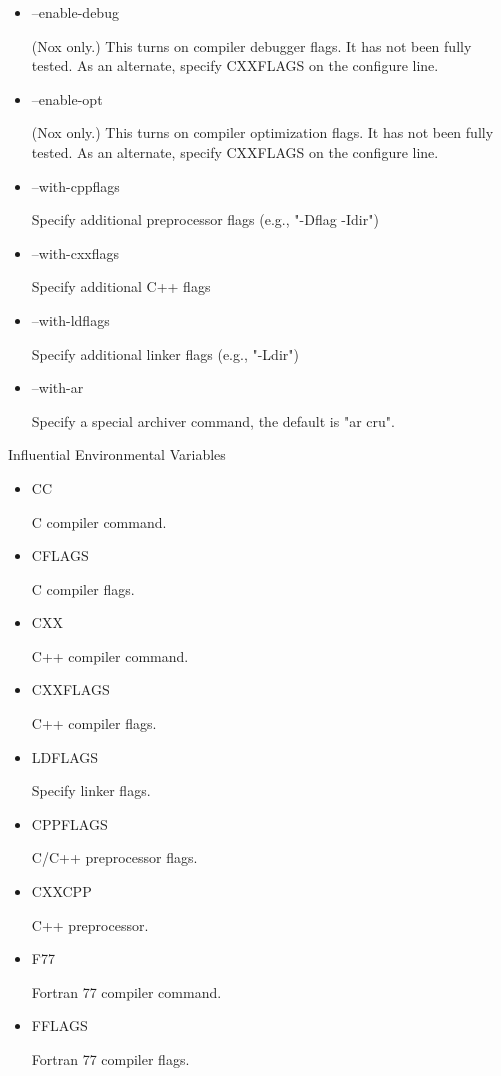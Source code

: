 \documentclass[12pt,relax]{SANDreport}
\begin{document}
\begin{itemize}
\item --enable-debug 

(Nox only.)  This turns on compiler debugger flags. It has 
not been fully tested. As an alternate, specify CXXFLAGS on the 
                 configure line.

\item --enable-opt

(Nox only.)  This turns on compiler optimization flags. It 
has not been fully tested. As an alternate, specify CXXFLAGS on the 
                 configure line. 

\item --with-cppflags 

Specify additional preprocessor flags (e.g., "-Dflag -Idir") 

\item --with-cxxflags 

Specify additional C++ flags 

\item --with-ldflags 

Specify additional linker flags (e.g., "-Ldir") 

\item --with-ar 

Specify a special archiver command, the default is "ar cru". 
\end{itemize}

 Influential Environmental Variables

\begin{itemize}
\item CC 

C compiler command.

\item CFLAGS 

C compiler flags.

\item CXX 

C++ compiler command.

\item CXXFLAGS 

C++ compiler flags.

\item LDFLAGS 

Specify linker flags.

\item CPPFLAGS 

C/C++ preprocessor flags.

\item CXXCPP 

C++ preprocessor.

\item F77 

Fortran 77 compiler command.

\item FFLAGS 

Fortran 77 compiler flags.
\end{itemize}
\end{document}
